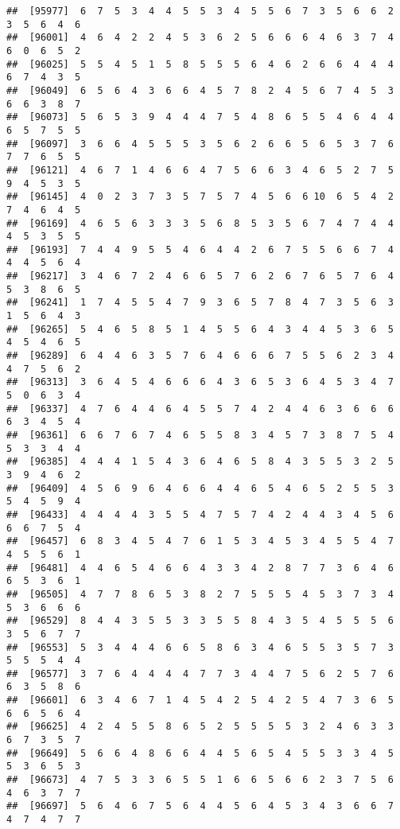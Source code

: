 \documentclass[
]{book}
\begin{document}
\begin{verbatim}
##  [95977]  6  7  5  3  4  4  5  5  3  4  5  5  6  7  3  5  6  6  2  3  5  6  4  6
##  [96001]  4  6  4  2  2  4  5  3  6  2  5  6  6  6  4  6  3  7  4  6  0  6  5  2
##  [96025]  5  5  4  5  1  5  8  5  5  5  6  4  6  2  6  6  4  4  4  6  7  4  3  5
##  [96049]  6  5  6  4  3  6  6  4  5  7  8  2  4  5  6  7  4  5  3  6  6  3  8  7
##  [96073]  5  6  5  3  9  4  4  4  7  5  4  8  6  5  5  4  6  4  4  6  5  7  5  5
##  [96097]  3  6  6  4  5  5  5  3  5  6  2  6  6  5  6  5  3  7  6  7  7  6  5  5
##  [96121]  4  6  7  1  4  6  6  4  7  5  6  6  3  4  6  5  2  7  5  9  4  5  3  5
##  [96145]  4  0  2  3  7  3  5  7  5  7  4  5  6  6 10  6  5  4  2  7  4  6  4  5
##  [96169]  4  6  5  6  3  3  3  5  6  8  5  3  5  6  7  4  7  4  4  4  5  3  5  5
##  [96193]  7  4  4  9  5  5  4  6  4  4  2  6  7  5  5  6  6  7  4  4  4  5  6  4
##  [96217]  3  4  6  7  2  4  6  6  5  7  6  2  6  7  6  5  7  6  4  5  3  8  6  5
##  [96241]  1  7  4  5  5  4  7  9  3  6  5  7  8  4  7  3  5  6  3  1  5  6  4  3
##  [96265]  5  4  6  5  8  5  1  4  5  5  6  4  3  4  4  5  3  6  5  4  5  4  6  5
##  [96289]  6  4  4  6  3  5  7  6  4  6  6  6  7  5  5  6  2  3  4  4  7  5  6  2
##  [96313]  3  6  4  5  4  6  6  6  4  3  6  5  3  6  4  5  3  4  7  5  0  6  3  4
##  [96337]  4  7  6  4  4  6  4  5  5  7  4  2  4  4  6  3  6  6  6  6  3  4  5  4
##  [96361]  6  6  7  6  7  4  6  5  5  8  3  4  5  7  3  8  7  5  4  5  3  3  4  4
##  [96385]  4  4  4  1  5  4  3  6  4  6  5  8  4  3  5  5  3  2  5  3  9  4  6  2
##  [96409]  4  5  6  9  6  4  6  6  4  4  6  5  4  6  5  2  5  5  3  5  4  5  9  4
##  [96433]  4  4  4  4  3  5  5  4  7  5  7  4  2  4  4  3  4  5  6  6  6  7  5  4
##  [96457]  6  8  3  4  5  4  7  6  1  5  3  4  5  3  4  5  5  4  7  4  5  5  6  1
##  [96481]  4  4  6  5  4  6  6  4  3  3  4  2  8  7  7  3  6  4  6  6  5  3  6  1
##  [96505]  4  7  7  8  6  5  3  8  2  7  5  5  5  4  5  3  7  3  4  5  3  6  6  6
##  [96529]  8  4  4  3  5  5  3  3  5  5  8  4  3  5  4  5  5  5  6  3  5  6  7  7
##  [96553]  5  3  4  4  4  6  6  5  8  6  3  4  6  5  5  3  5  7  3  5  5  5  4  4
##  [96577]  3  7  6  4  4  4  4  7  7  3  4  4  7  5  6  2  5  7  6  6  3  5  8  6
##  [96601]  6  3  4  6  7  1  4  5  4  2  5  4  2  5  4  7  3  6  5  6  6  5  6  4
##  [96625]  4  2  4  5  5  8  6  5  2  5  5  5  5  3  2  4  6  3  3  6  7  3  5  7
##  [96649]  5  6  6  4  8  6  6  4  4  5  6  5  4  5  5  3  3  4  5  5  3  6  5  3
##  [96673]  4  7  5  3  3  6  5  5  1  6  6  5  6  6  2  3  7  5  6  4  6  3  7  7
##  [96697]  5  6  4  6  7  5  6  4  4  5  6  4  5  3  4  3  6  6  7  4  7  4  7  7

\end{verbatim}
\end{document}
